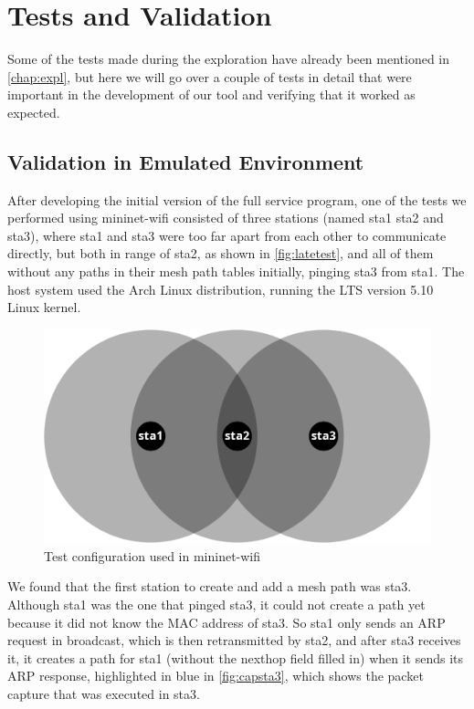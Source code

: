\chapter{Tests and Validation}\label{chap:tests}

Some of the tests made during the exploration have already been mentioned in
\autoref{chap:expl}, but here we will go over a couple of tests in detail that
were important in the development of our tool and verifying that it worked as
expected.

\section{Validation in Emulated Environment}

After developing the initial version of the full service program, one of the
tests we performed using mininet-wifi consisted of three stations (named sta1
sta2 and sta3), where sta1 and sta3 were too far apart from each other to
communicate directly, but both in range of sta2, as shown in
\autoref{fig:latetest}, and all of them without any paths in their mesh path
tables initially, pinging sta3 from sta1. The host system used the Arch Linux
distribution, running the \ac{LTS} version 5.10 Linux kernel.

\begin{figure}[htb]
   \centering
   \includegraphics[scale=.3]{latetest}
   \caption{Test configuration used in mininet-wifi}\label{fig:latetest}
\end{figure}

We found that the first station to create and add a mesh path was sta3. Although
sta1 was the one that pinged sta3, it could not create a path yet because it did
not know the \ac{MAC} address of sta3. So sta1 only sends an \ac{ARP} request in
broadcast, which is then retransmitted by sta2, and after sta3 receives it, it
creates a path for sta1 (without the nexthop field filled in) when it sends its
\ac{ARP} response, highlighted in blue in \autoref{fig:capsta3}, which shows the
packet capture that was executed in sta3.

